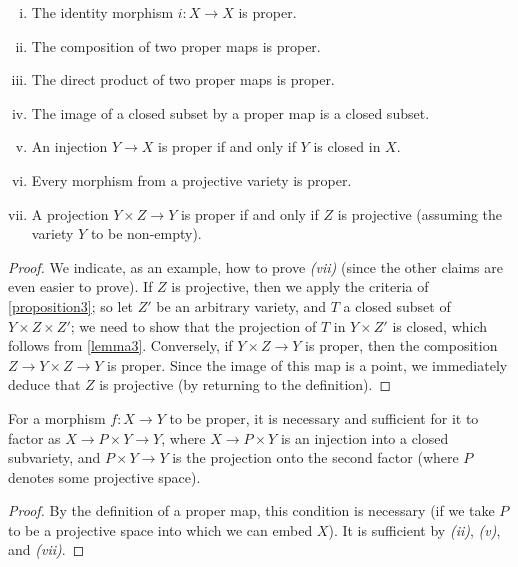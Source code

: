 \documentclass[10pt]{article}
\theoremstyle{plain}
\newenvironment{proposition}[1]
  {\renewcommand\theinnercustomproposition{#1}\innercustomproposition}
  {\endinnercustomproposition}
\newenvironment{corollary}[1]
  {\renewcommand\theinnercustomcorollary{#1}\innercustomcorollary}
  {\endinnercustomcorollary}
\theoremstyle{definition}
\begin{document}
\begin{proposition}{4}
\label{proposition4}
  \begin{enumerate}[(i)]
    \item The identity morphism $i\colon X\to X$ is proper.
    \item The composition of two proper maps is proper.
    \item The direct product of two proper maps is proper.
    \item The image of a closed subset by a proper map is a closed subset.
    \item An injection $Y\to X$ is proper if and only if $Y$ is closed in $X$.
    \item Every morphism from a projective variety is proper.
    \item A projection $Y\times Z\to Y$ is proper if and only if $Z$ is projective (assuming the variety $Y$ to be non-empty).
  \end{enumerate}
\end{proposition}

\begin{proof}
  We indicate, as an example, how to prove \emph{(vii)} (since the other claims are even easier to prove).
  If $Z$ is projective, then we apply the criteria of \cref{proposition3};
  so let $Z'$ be an arbitrary variety, and $T$ a closed subset of $Y\times Z\times Z'$;
  we need to show that the projection of $T$ in $Y\times Z'$ is closed, which follows from \cref{lemma3}.
  Conversely, if $Y\times Z\to Y$ is proper, then the composition $Z\to Y\times Z\to Y$ is proper.
  Since the image of this map is a point, we immediately deduce that $Z$ is projective (by returning to the definition).
\end{proof}

\begin{corollary}{5}
\label{corollary5}
  For a morphism $f\colon X\to Y$ to be proper, it is necessary and sufficient for it to factor as $X\to P\times Y\to Y$, where $X\to P\times Y$ is an injection into a closed subvariety, and $P\times Y\to Y$ is the projection onto the second factor (where $P$ denotes some projective space).
\end{corollary}

\begin{proof}
  By the definition of a proper map, this condition is necessary (if we take $P$ to be a projective space into which we can embed $X$).
  It is sufficient by \emph{(ii)}, \emph{(v)}, and \emph{(vii)}.
\end{proof}
\end{document}
